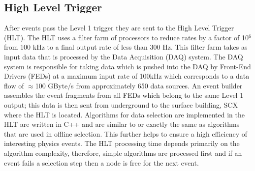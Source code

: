   \subsection{High Level Trigger}
After events pass the Level 1 trigger they are sent to the High Level Trigger (HLT). The
HLT uses a filter farm of processors to reduce rates by a factor of 10$^{6}$ from 
100 kHz to a final output rate of less than 300 Hz. This filter farm takes as input
data that is processed by the Data Acquisition (DAQ) system. The DAQ system is responsible
for taking data which is pushed into the DAQ by Front-End Drivers (FEDs) at a maximum input 
rate of 100kHz which corresponds to a data flow of $\approx$100 GByte/s from approximately
650 data sources. An event builder assembles the event fragments from all FEDs
which belong to the same Level 1 output; this data is then sent from underground to the surface %
building, SCX where the HLT is located.
Algorithms for data selection are implemented in the HLT are written in
C++ and are similar to or exactly the same as algorithms that are used in offline selection. This 
further helps to ensure a high efficiency of interesting physics events.
The HLT processing time depends primarily on the algorithm complexity,
therefore, simple algorithms are processed first and if an event fails a selection
step then a node is free for the next event.
